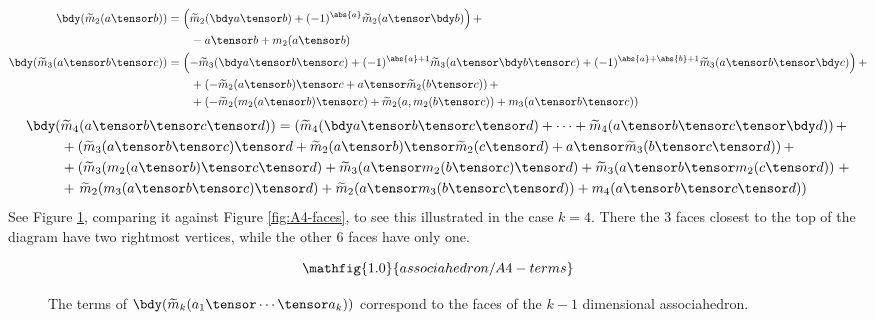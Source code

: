 \documentclass[11pt,leqno]{amsart}
\begin{document}
\begin{align*}
\bdy(\tm_2(a \tensor b)) & = \left(\tm_2(\bdy a \tensor b) + (-1)^{\abs{a}} \tm_2(a \tensor \bdy b)\right) + \\
                         & \qquad - a \tensor b + m_2(a \tensor b) \\
\bdy(\tm_3(a \tensor b \tensor c)) & = \left(- \tm_3(\bdy a \tensor b \tensor c) + (-1)^{\abs{a} + 1} \tm_3(a \tensor \bdy b \tensor c) + (-1)^{\abs{a} + \abs{b} + 1} \tm_3(a \tensor b \tensor \bdy c)\right) + \\
                                   & \qquad + \left(- \tm_2(a \tensor b) \tensor c + a \tensor \tm_2(b \tensor c)\right) + \\
                                   & \qquad + \left(- \tm_2(m_2(a \tensor b) \tensor c) + \tm_2(a, m_2(b \tensor c)) + m_3(a \tensor b \tensor c)\right)
\end{align*}
\begin{align*}
\bdy(& \tm_4(a \tensor b \tensor c \tensor d)) = \left(\tm_4(\bdy a \tensor b \tensor c \tensor d) + \cdots + \tm_4(a \tensor b \tensor c \tensor \bdy d)\right) + \\
                                             & + \left(\tm_3(a \tensor b \tensor c) \tensor d + \tm_2(a \tensor b) \tensor \tm_2(c \tensor d) + a \tensor \tm_3(b \tensor c \tensor d)\right) + \\
                                             & + \left(\tm_3(m_2(a \tensor b) \tensor c \tensor d) + \tm_3(a \tensor m_2(b \tensor c) \tensor d) + \tm_3(a \tensor b \tensor m_2(c \tensor d))\right. + \\
                                             & + \left.\tm_2(m_3(a \tensor b \tensor c) \tensor d) + \tm_2(a \tensor m_3(b \tensor c \tensor d)) + m_4(a \tensor b \tensor c \tensor d)\right) \\
\end{align*}
See Figure \ref{fig:A4-terms}, comparing it against Figure \ref{fig:A4-faces}, to see this illustrated in the case $k=4$. There the $3$ faces closest
to the top of the diagram have two rightmost vertices, while the other $6$ faces have only one.

\begin{figure}[!ht]
\begin{equation*}
\mathfig{1.0}{associahedron/A4-terms}
\end{equation*}
\caption{The terms of $\bdy(\tm_k(a_1 \tensor \cdots \tensor a_k))$ correspond to the faces of the $k-1$ dimensional associahedron.}
\label{fig:A4-terms}
\end{figure}
\end{document}
